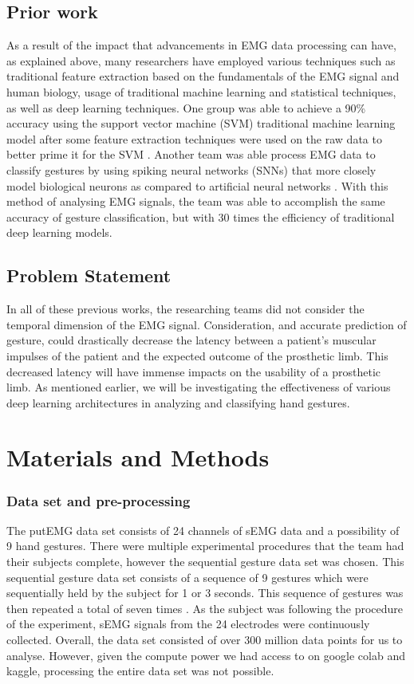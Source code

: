 \documentclass[conference]{IEEEtran}
\begin{document}
\subsection{Prior work}
As a result of the impact that advancements in EMG data processing can have, as explained above, many researchers have employed various techniques such as traditional feature extraction based on the fundamentals of the EMG signal and human biology, usage of traditional machine learning and statistical techniques, as well as deep learning techniques. One group was able to achieve a 90\% accuracy using the support vector machine (SVM) traditional machine learning model after some feature extraction techniques were used on the raw data to better prime it for the SVM \cite{b1}. Another team was able process EMG data to classify gestures by using spiking neural networks (SNNs) that more closely model biological neurons as compared to artificial neural networks \cite{b4}. With this method of analysing EMG signals, the team was able to accomplish the same accuracy of gesture classification, but with 30 times the efficiency of traditional deep learning models. 

\subsection{Problem Statement}
In all of these previous works, the researching teams did not consider the temporal dimension of the EMG signal. Consideration, and accurate prediction of gesture, could drastically decrease the latency between a patient's muscular impulses of the patient and the expected outcome of the prosthetic limb. This decreased latency will have immense impacts on the usability of a prosthetic limb. As mentioned earlier, we will be investigating the effectiveness of various deep learning architectures in analyzing and classifying hand gestures.
\section{Materials and Methods}
\subsubsection{Data set and pre-processing}
The putEMG data set consists of 24 channels of sEMG data and a possibility of 9 hand gestures. There were multiple experimental procedures that the team had their subjects complete, however the sequential gesture data set was chosen. This sequential gesture data set consists of a sequence of 9 gestures which were sequentially held by the subject for 1 or 3 seconds. This sequence of gestures was then repeated a total of seven times \cite{b5}. As the subject was following the procedure of the experiment, sEMG signals from the 24 electrodes were continuously collected. Overall, the data set consisted of over 300 million data points for us to analyse. However, given the compute power we had access to on google colab and kaggle, processing the entire data set was not possible. 
\end{document}
